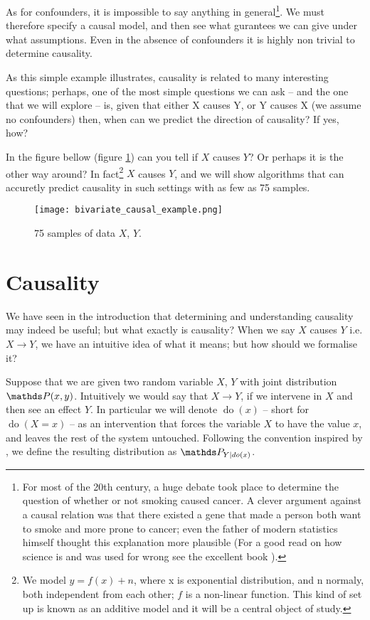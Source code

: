 As for confounders, it is impossible to say anything in general\footnote{
    For most of the 20th century, a huge debate took place to determine the question of whether or not 
    smoking caused cancer. A clever argument against a causal relation was that there existed a gene that 
    made a person both want to smoke and more prone to cancer; even the father of modern statistics
    himself thought this explanation more plausible (For a good read on how science is and was used 
    for wrong see the excellent book \cite{NaomiMerchants}).
    
}. We must therefore specify a causal model, and
then see what gurantees we can give under what assumptions. Even in the absence of confounders it is highly 
non trivial to determine causality.

As this simple example illustrates, causality is related to many interesting questions; perhaps, one of the most 
simple questions we can ask -- and the one that we will explore -- is, given that either X causes Y, or Y causes X
(we assume no confounders) then, when 
can we predict the direction of causality? If yes, how? 

In the figure bellow (figure \ref{fig:simple_bivariate_example}) can you tell if $X$ causes $Y$? Or perhaps
it is the other way around? In fact\footnote{ We model $y = f(x) + n$,  where x is exponential distribution, and n 
normaly, both independent from each other; $f$ is a non-linear function. This kind of set up is known as an 
additive model and it will be a central object of study.} $X$ causes $Y$, and we will show algorithms that 
can accuretly predict causality in such settings with as few as 75 samples. 

\begin{figure}[H]
    \centering
    \texttt{[image: bivariate\_causal\_example.png]}
    \caption{75 samples of data $X$, $Y$.  }
    \label{fig:simple_bivariate_example}
\end{figure}

\section{Causality}

We have seen in the introduction that determining and understanding causality may indeed be useful; 
but what exactly is causality? When we say $X$ causes $Y$ i.e. $X \rightarrow Y$, we have an intuitive
idea of what it means; but how should we formalise it?

Suppose that we are given two random variable $X$, $Y$ with joint distribution $\Prob (x, y)$. Intuitively we 
would say that $X \rightarrow Y$, if we intervene in $X$ and then see an effect $Y$. In particular
we will denote $\operatorname{do}(x)$ -- short for $\operatorname{do}(X = x)$ -- as an intervention
that forces the variable $X$ to have the value $x$, and leaves the rest of the system untouched. 
Following the convention inspired by \cite{pearl2000causality}, 
we define the resulting distribution as $\Prob_{Y|do(x)}$.


